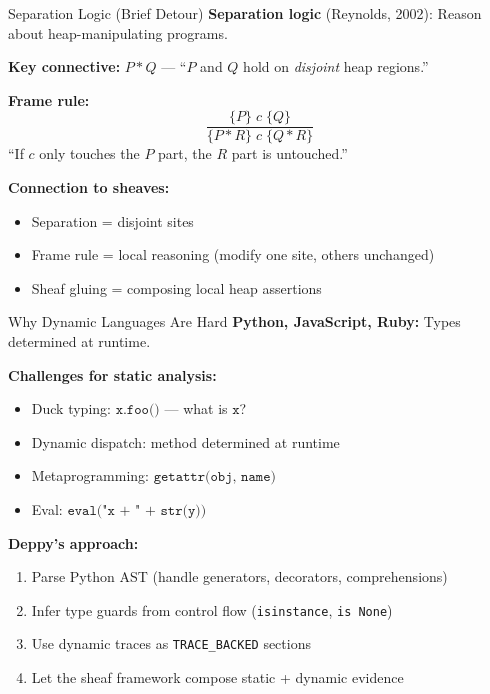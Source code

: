 \documentclass[aspectratio=169,10pt]{beamer}
\begin{document}
\begin{frame}{Separation Logic (Brief Detour)}
\textbf{Separation logic} (Reynolds, 2002): Reason about heap-manipulating programs.

\textbf{Key connective:} $P * Q$ --- ``$P$ and $Q$ hold on \emph{disjoint} heap regions.''

\textbf{Frame rule:}
\[
\frac{\{P\}\; c \;\{Q\}}{\{P * R\}\; c \;\{Q * R\}}
\]
``If $c$ only touches the $P$ part, the $R$ part is untouched.''

\vspace{0.3em}
\textbf{Connection to sheaves:}
\begin{itemize}
  \item Separation = disjoint sites
  \item Frame rule = local reasoning (modify one site, others unchanged)
  \item Sheaf gluing = composing local heap assertions
\end{itemize}
\end{frame}

\begin{frame}{Why Dynamic Languages Are Hard}
\textbf{Python, JavaScript, Ruby:} Types determined at runtime.

\textbf{Challenges for static analysis:}
\begin{itemize}
  \item Duck typing: $\texttt{x.foo()}$ --- what is $\texttt{x}$?
  \item Dynamic dispatch: method determined at runtime
  \item Metaprogramming: $\texttt{getattr(obj, name)}$
  \item Eval: $\texttt{eval("x + " + str(y))}$
\end{itemize}

\vspace{0.5em}
\textbf{Deppy's approach:}
\begin{enumerate}
  \item Parse Python AST (handle generators, decorators, comprehensions)
  \item Infer type guards from control flow (\texttt{isinstance}, \texttt{is None})
  \item Use dynamic traces as \texttt{TRACE\_BACKED} sections
  \item Let the sheaf framework compose static + dynamic evidence
\end{enumerate}
\end{frame}
\end{document}
